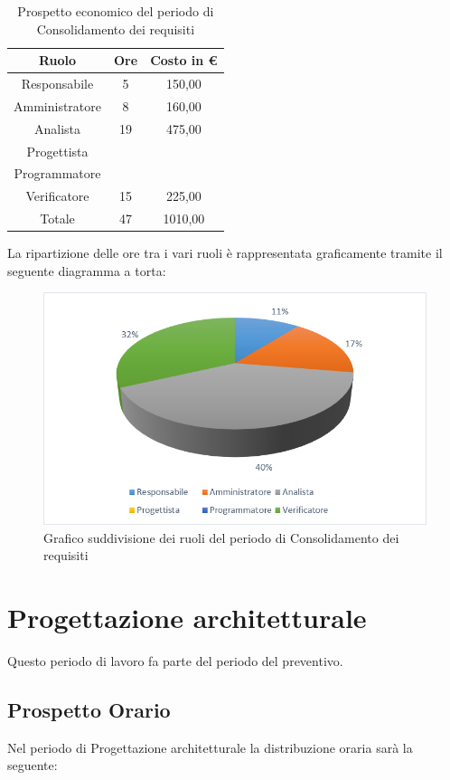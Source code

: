 \documentclass[./PianodiProgetto.tex]{subfiles}
\begin{document}
\begin{table}[H]
	\centering
	\begin{tabular}{|c|c|c|}
		\hline
		Ruolo&Ore&Costo in \euro{} \\ \hline
		Responsabile&5&150,00  \\ \hline
		Amministratore&8&160,00  \\ \hline
		Analista&19&475,00  \\ \hline
		Progettista& &  \\ \hline
		Programmatore& &  \\ \hline
		Verificatore&15&225,00  \\ \hline
		Totale&47&1010,00 \\ \hline
	\end{tabular}
	\caption{Prospetto economico del periodo di Consolidamento dei requisiti}
\end{table}

La ripartizione delle ore tra i vari ruoli è rappresentata graficamente tramite il seguente diagramma a torta:
\begin{figure}[H]
	\centering
	\includegraphics[width=1\linewidth]{img/grafici/ConsolidamentoRequisitiProspettoEconomico}
	\caption{Grafico suddivisione dei ruoli del periodo di Consolidamento dei requisiti}
	\label{fig:consolidamento-requisiti-prospetto-economico}
\end{figure}

\section{Progettazione architetturale}
Questo periodo di lavoro fa parte del periodo del preventivo.
\subsection{Prospetto Orario}
Nel periodo di Progettazione architetturale la distribuzione oraria sarà la seguente:
\end{document}
